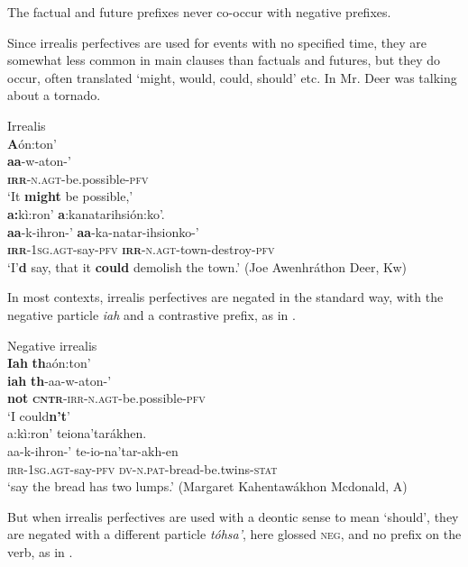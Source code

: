 \documentclass[output=paper,colorlinks,citecolor=brown]{langscibook}
\begin{document}
The factual and future prefixes never co-occur with negative prefixes.

Since irrealis perfectives are used for events with no specified time, they are somewhat less common in main clauses than factuals and futures, but they do occur, often translated ‘might, would, could, should’ etc. In  Mr. Deer was talking about a tornado.

{\ea\label{ex:moh:22}Irrealis\\
    \glll \textbf{A}ón:ton’ \\ 
         \textbf{aa}-w-aton-’ \\ 
         \textbf{\textsc{irr}}\textsc{-n.agt}-be.possible-\textsc{pfv} \\
    \glt ‘It \textbf{might} be possible,’\\ \medskip
    \glll \textbf{a:}kì:ron’ \textbf{a}:kanatarihsión:ko’. \\ 
          \textbf{aa}-k-ihron-’ \textbf{aa}-ka-natar-ihsionko-’\\
          \textbf{\textsc{irr}}\textsc{-1sg.agt-}say-\textsc{pfv} \textbf{\textsc{irr}}\textsc{-n.agt}-town-destroy-\textsc{pfv}\\
    \glt  ‘I’\textbf{d} say, that it \textbf{could} demolish the town.’ (Joe Awenhráthon Deer, Kw)
\z}

In most contexts, irrealis perfectives are negated in the standard way, with the negative particle \textit{iah} and a contrastive prefix, as in .

\ea\label{ex:moh:23}Negative irrealis\\
    \glll \textbf{Iah} \textbf{th}aón:ton’ \\ 
         \textbf{iah} \textbf{th}-aa-w-aton-’ \\ 
         \textbf{not} \textsc{\textbf{cntr}-irr-n.agt}-be.possible-\textsc{pfv} \\
    \glt ‘I could\textbf{n’t}’\\ \medskip 
    \glll  a:kì:ron’ teiona’tarákhen.\\ 
      aa-k-ihron-’ te-io-na’tar-akh-en\\
      \textsc{irr-1sg.agt}-say-\textsc{pfv} \textsc{dv-n.pat}-bread-be.twins-\textsc{stat}\\
    \glt  ‘say the bread has two lumps.’ (Margaret Kahentawákhon Mcdonald, A)
\z 

But when irrealis perfectives are used with a deontic sense to mean ‘should’, they are negated with a different particle \textit{tóhsa’}, here glossed \textsc{neg}, and no prefix on the verb, as in .
\end{document}
